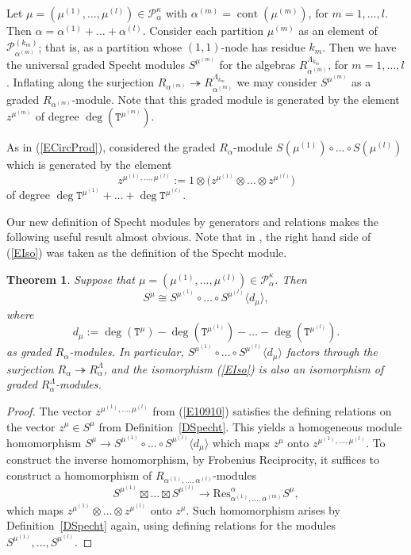 \documentclass[twoside,11pt,reqno]{amsart}
\numberwithin{equation}{section}
\newtheorem{Theorem}[equation]{Theorem}
\theoremstyle{definition}  %
\newcommand{\cont}{\operatorname{cont}}
\newcommand{\0}{{\bar 0}}
\newcommand{\1}{{\bar 1}}
\newcommand{\La}{\Lambda}
\newcommand{\al}{\alpha}
\newcommand{\Res}{{\mathrm {Res}}}
\newcommand\Par[1][]{{\mathscr P}^{\kappa#1}}
\def\T{{\mathtt T}}
\def\onto{{\twoheadrightarrow}}
\begin{document}
Let  $\mu=(\mu^{(1)},\dots,\mu^{(l)})\in\Par_\al$ with $\al^{(m)}=\cont(\mu^{(m)})$, for $m=1,\dots,l$. 
Then $\al=\al^{(1)}+\dots+\al^{(l)}$. %
Consider each partition $\mu^{(m)}$ as an element of ${\mathscr P}_{\al^{(m)}}^{(k_m)}$; that is, as a
partition whose $(1,1)$-node has residue $k_m$.  Then we have the universal graded Specht modules
$S^{\mu^{(m)}}$ for the algebras $R_{\al^{(m)}}^{\La_{k_m}}$, for $m=1,\dots,l$. Inflating along the surjection
$R_{\al^{(m)}}\onto R_{\al^{(m)}}^{\La_{k_m}}$ we may consider $S^{\mu^{(m)}}$ as a graded
$R_{\al^{(m)}}$-module.  Note that this graded module is generated by the element $z^{\mu^{(m)}}$ of degree
$\deg (\T^{\mu^{(m)}})$. 

As in (\ref{ECircProd}), considered the graded  $R_\al$-module 
$S(\mu^{(1)})\circ\dots\circ S(\mu^{(l)})$ which is generated by the element 
\begin{equation}\label{E10910}
z^{\mu^{(1)},\dots,\mu^{(l)}}:=1\otimes\big(z^{\mu^{(1)}}\otimes\dots\otimes z^{\mu^{(l)}}\big)
\end{equation}
of degree $\deg \T^{\mu^{(1)}}+\dots+\deg \T^{\mu^{(l)}}$. 

Our new definition of Specht modules by generators and relations makes the following useful result almost obvious. Note that in \cite{Vaz}, \cite[(3.24)]{BKariki} the right hand side of (\ref{EIso}) was taken as the definition of the Specht module.  


\begin{Theorem}\label{TSpechtHigherLevel}%
Suppose that $\mu=(\mu^{(1)},\dots,\mu^{(l)})\in\Par_\al$. Then
\begin{equation}\label{EIso}
S^\mu\cong S^{\mu^{(1)}}\circ\dots\circ S^{\mu^{(l)}}\langle d_\mu\rangle,
\end{equation}
where
$$d_\mu:=\deg(\T^\mu)-\deg (\T^{\mu^{(1)}})-\dots-\deg (\T^{\mu^{(l)}}).$$
as graded $R_\al$-modules. In particular, $S^{\mu^{(1)}}\circ\dots\circ S^{\mu^{(l)}}\langle d_\mu\rangle $ factors through the surjection $R_\al\onto R_\al^\La$, and the isomorphism (\ref{EIso}) is also an isomorphism of graded $R_\al^\La$-modules. 
\end{Theorem}
\begin{proof}
The vector $z^{\mu^{(1)},\dots,\mu^{(l)}}$ from (\ref{E10910}) 
satisfies the defining relations on the vector $z^\mu\in S^\mu$ from  Definition~\ref{DSpecht}. This yields a homogeneous module homomorphism $S^\mu\longrightarrow S^{\mu^{(1)}}\circ\dots\circ S^{\mu^{(l)}}\langle d_\mu\rangle$ which maps $z^\mu$ onto $z^{\mu^{(1)},\dots,\mu^{(l)}}$.  
To construct the inverse homomorphism, by Frobenius Reciprocity, it suffices to construct a homomorphism of $R_{\al^{(1)},\dots,\al^{(l)}}$-modules 
$$
S^{\mu^{(1)}}\boxtimes\dots\boxtimes S^{\mu^{(l)}}\longrightarrow \Res^{\al}_{\al^{(1)},\dots,\al^{(m)}}S^{\mu},
$$
which maps $z^{\mu^{(1)}}\otimes\dots\otimes z^{\mu^{(l)}}$ onto $z^\mu$. Such homomorphism arises by Definition~\ref{DSpecht} again, using defining relations for the modules $
S^{\mu^{(1)}},\dots, S^{\mu^{(l)}}$. 
\end{proof}
\end{document}
